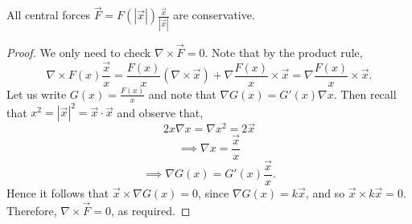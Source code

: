 \begin{theorem}
  All central forces $\vec{F}=F(|\vec{x}|)\frac{\vec{x}}{|\vec{x}|}$ are
  conservative.
  \label{thm:centralForcesConserv}
\end{theorem}
\begin{proof}
  We only need to check $\nabla\times\vec{F}=0$. Note that by the product rule,
  \[\nabla\times F(x)\frac{\vec{x}}{x} = \frac{F(x)}{x}(\nabla\times\vec{x}) +
  \nabla \frac{F(x)}{x} \times \vec{x} = \nabla \frac{F(x)}{x} \times \vec{x}.\]
  Let us write $G(x)=\frac{F(x)}{x}$ and note that $\nabla G(x)= G'(x)\nabla x$.
  Then recall that $x^2=|\vec{x}|^2 = \vec{x}\cdot\vec{x}$ and observe that,
  \[2x \nabla x = \nabla x^2 = 2\vec{x}\]
  \[\implies \nabla x = \frac{\vec{x}}{x}\]
  \[\implies \nabla G(x)= G'(x)\frac{\vec{x}}{x}.\]
  Hence it follows that $\vec{x}\times \nabla G(x)=0$, since $\nabla
  G(x)=k\vec{x}$, and so $\vec{x}\times k\vec{x}=0$. Therefore, $\nabla \times
  \vec{F}=0$, as required.
\end{proof}

